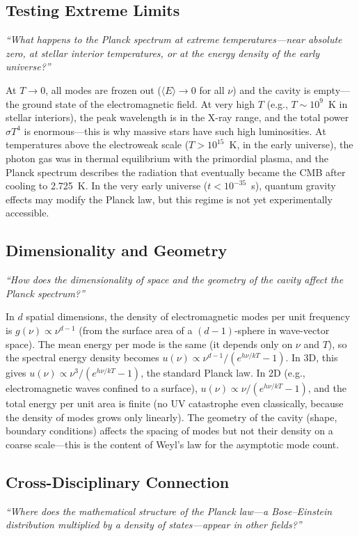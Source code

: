 \subsection*{Testing Extreme Limits}
\textit{``What happens to the Planck spectrum at extreme temperatures---near absolute zero, at stellar interior temperatures, or at the energy density of the early universe?''}

At $T \to 0$, all modes are frozen out ($\langle E\rangle \to 0$ for all $\nu$) and the cavity is empty---the ground state of the electromagnetic field. At very high $T$ (e.g., $T \sim 10^{9}$~K in stellar interiors), the peak wavelength is in the X-ray range, and the total power $\sigma T^{4}$ is enormous---this is why massive stars have such high luminosities. At temperatures above the electroweak scale ($T > 10^{15}$~K, in the early universe), the photon gas was in thermal equilibrium with the primordial plasma, and the Planck spectrum describes the radiation that eventually became the CMB after cooling to 2.725~K. In the very early universe ($t < 10^{-35}$~s), quantum gravity effects may modify the Planck law, but this regime is not yet experimentally accessible.

\subsection*{Dimensionality and Geometry}
\textit{``How does the dimensionality of space and the geometry of the cavity affect the Planck spectrum?''}

In $d$ spatial dimensions, the density of electromagnetic modes per unit frequency is $g(\nu) \propto \nu^{d-1}$ (from the surface area of a $(d-1)$-sphere in wave-vector space). The mean energy per mode is the same (it depends only on $\nu$ and $T$), so the spectral energy density becomes $u(\nu) \propto \nu^{d-1}/(e^{h\nu/kT} - 1)$. In 3D, this gives $u(\nu) \propto \nu^{3}/(e^{h\nu/kT} - 1)$, the standard Planck law. In 2D (e.g., electromagnetic waves confined to a surface), $u(\nu) \propto \nu/(e^{h\nu/kT} - 1)$, and the total energy per unit area is finite (no UV catastrophe even classically, because the density of modes grows only linearly). The geometry of the cavity (shape, boundary conditions) affects the spacing of modes but not their density on a coarse scale---this is the content of Weyl's law for the asymptotic mode count.

\subsection*{Cross-Disciplinary Connection}
\textit{``Where does the mathematical structure of the Planck law---a Bose--Einstein distribution multiplied by a density of states---appear in other fields?''}

